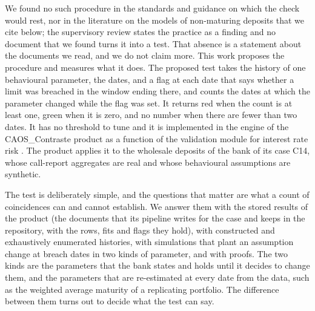 We found no such procedure in the standards and guidance on which the check would rest, nor in the literature on the models of non-maturing deposits that we cite below; the supervisory review states the practice as a finding and no document that we found turns it into a test. That absence is a statement about the documents we read, and we do not claim more. This work proposes the procedure and measures what it does. The proposed test takes the history of one behavioural parameter, the dates, and a flag at each date that says whether a limit was breached in the window ending there, and counts the dates at which the parameter changed while the flag was set. It returns red when the count is at least one, green when it is zero, and no number when there are fewer than two dates. It has no threshold to tune and it is implemented in the engine of the CAOS\_Contraste product as a function of the validation module for interest rate risk \citep{riskvalidation2026}. The product applies it to the wholesale deposits of the bank of its case C14, whose call-report aggregates are real and whose behavioural assumptions are synthetic.

The test is deliberately simple, and the questions that matter are what a count of coincidences can and cannot establish. We answer them with the stored results of the product (the documents that its pipeline writes for the case and keeps in the repository, with the rows, fits and flags they hold), with constructed and exhaustively enumerated histories, with simulations that plant an assumption change at breach dates in two kinds of parameter, and with proofs. The two kinds are the parameters that the bank states and holds until it decides to change them, and the parameters that are re-estimated at every date from the data, such as the weighted average maturity of a replicating portfolio. The difference between them turns out to decide what the test can say.

